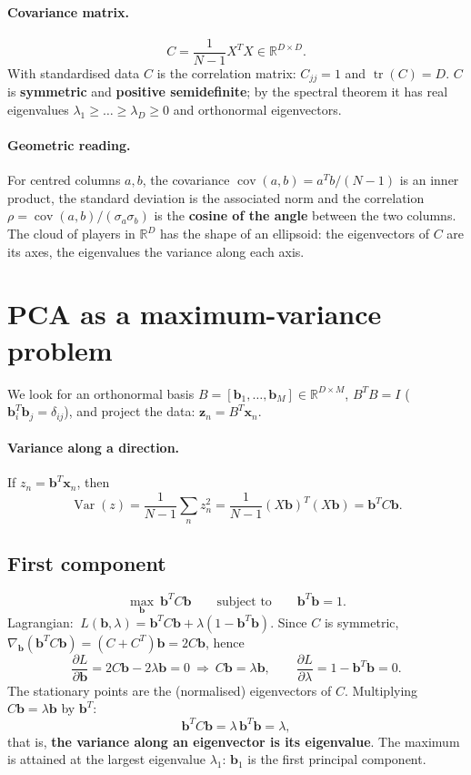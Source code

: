 \documentclass[11pt,a4paper]{article}
\theoremstyle{remark}
\newcommand{\R}{\mathbb{R}}
\newcommand{\bb}{\mathbf{b}}
\newcommand{\x}{\mathbf{x}}
\newcommand{\z}{\mathbf{z}}
\begin{document}
\paragraph{Covariance matrix.}
\[
C=\frac{1}{N-1}X^{T}X\in\R^{D\times D}.
\]
With standardised data $C$ is the correlation matrix: $C_{jj}=1$ and $\operatorname{tr}(C)=D$.
$C$ is \textbf{symmetric} and \textbf{positive semidefinite}; by the spectral theorem it has real
eigenvalues $\lambda_1\ge\dots\ge\lambda_D\ge 0$ and orthonormal eigenvectors.

\paragraph{Geometric reading.}
For centred columns $a,b$, the covariance $\operatorname{cov}(a,b)=a^Tb/(N-1)$ is an inner product,
the standard deviation is the associated norm and the correlation
$\rho=\operatorname{cov}(a,b)/(\sigma_a\sigma_b)$ is the \textbf{cosine of the angle} between the two columns.
The cloud of players in $\R^D$ has the shape of an ellipsoid: the eigenvectors of $C$ are its axes,
the eigenvalues the variance along each axis.

\section{PCA as a maximum-variance problem}
We look for an orthonormal basis $B=[\bb_1,\dots,\bb_M]\in\R^{D\times M}$, $B^TB=I$
($\bb_i^T\bb_j=\delta_{ij}$), and project the data: $\z_n=B^T\x_n$.

\paragraph{Variance along a direction.}
If $z_n=\bb^T\x_n$, then
\[
\operatorname{Var}(z)=\frac{1}{N-1}\sum_n z_n^2=\frac{1}{N-1}(X\bb)^T(X\bb)=\bb^TC\bb .
\]

\subsection{First component}
\[
\max_{\bb}\ \bb^TC\bb\qquad\text{subject to}\qquad \bb^T\bb=1 .
\]
Lagrangian: $\ L(\bb,\lambda)=\bb^TC\bb+\lambda(1-\bb^T\bb)$.
Since $C$ is symmetric, $\nabla_{\bb}(\bb^TC\bb)=(C+C^T)\bb=2C\bb$, hence
\[
\frac{\partial L}{\partial\bb}=2C\bb-2\lambda\bb=0\ \Longrightarrow\ C\bb=\lambda\bb,
\qquad
\frac{\partial L}{\partial\lambda}=1-\bb^T\bb=0 .
\]
The stationary points are the (normalised) eigenvectors of $C$. Multiplying $C\bb=\lambda\bb$ by $\bb^T$:
\[
\bb^TC\bb=\lambda\,\bb^T\bb=\lambda,
\]
that is, \textbf{the variance along an eigenvector is its eigenvalue}.
The maximum is attained at the largest eigenvalue $\lambda_1$: $\bb_1$ is the first principal component.
\end{document}
